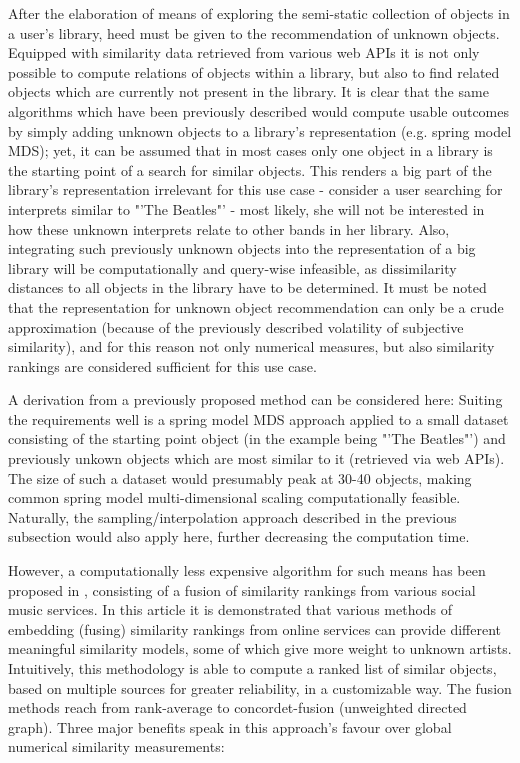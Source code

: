 After the elaboration of means of exploring the semi-static collection of objects in a user's library, heed must be given to the recommendation of unknown objects. Equipped with similarity data retrieved from various web APIs it is not only possible to compute relations of objects within a library, but also to find related objects which are currently not present in the library. It is clear that the same algorithms which have been previously described would compute usable outcomes by simply adding unknown objects to a library's representation (e.g. spring model MDS); yet, it can be assumed that in most cases only one object in a library is the starting point of a search for similar objects. This renders a big part of the library's representation irrelevant for this use case - consider a user searching for interprets similar to "'The Beatles"' - most likely, she will not be interested in how these unknown interprets relate to other bands in her library. Also, integrating such previously unknown objects into the representation of a big library will be computationally and query-wise infeasible, as dissimilarity distances to all objects in the library have to be determined. It must be noted that the representation for unknown object recommendation can only be a crude approximation (because of the previously described volatility of subjective similarity), and for this reason not only numerical measures, but also similarity rankings are considered sufficient for this use case.

A derivation from a previously proposed method can be considered here: Suiting the requirements well is a spring model MDS approach applied to a small dataset consisting of the starting point object (in the example being "'The Beatles"') and previously unkown objects which are most similar to it (retrieved via web APIs). The size of such a dataset would presumably peak at 30-40 objects, making common spring model multi-dimensional scaling computationally feasible. Naturally, the sampling/interpolation approach described in the previous subsection would also apply here, further decreasing the computation time.

However, a computationally less expensive algorithm for such means has been proposed in \cite{Marshall:2010}, consisting of a fusion of similarity rankings from various social music services. In this article it is demonstrated that various methods of embedding (fusing) similarity rankings from online services can provide different meaningful similarity models, some of which give more weight to unknown artists. Intuitively, this methodology is able to compute a ranked list of similar objects, based on multiple sources for greater reliability, in a customizable way. The fusion methods reach from rank-average to concordet-fusion (unweighted directed graph). Three major benefits speak in this approach's favour over global numerical similarity measurements:

